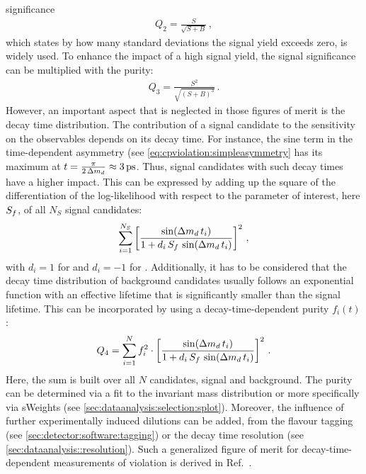 significance
\begin{align}
	Q_2 = \frac{S}{\sqrt{S + B}}\,,
\end{align}
which states by how many standard deviations the signal yield exceeds zero, is
widely used. To enhance the impact of a high signal yield, the signal
significance can be multiplied with the purity:
\begin{align}
	Q_3 = \frac{S^2}{\sqrt{(S + B)^3}}\,.
\end{align}
However, an important aspect that is neglected in those figures of merit is
the decay time distribution. The contribution of a signal candidate to the
sensitivity on the \CP observables depends on its decay time. For instance,
the sine term in the time-dependent asymmetry (see
\cref{eq:cpviolation:simpleasymmetry} has its maximum at $t =
\frac{\pi}{2\,\dmd} \approx \SI{3}{\ps}$. Thus, signal candidates with such
decay times have a higher impact. This can be expressed by adding up the
square of the differentiation of the log-likelihood with respect to the
parameter of interest, here $S_{f}$, of all $N_S$ signal candidates:
\begin{align}
	\sum_{i=1}^{N_S} \left[\frac{\sin({\Delta m_{{d}}}\,t_i)}{1 + d_i\,S_f\,\sin({\Delta m_{{d}}}\,t_i)}\right]^2\,,
\end{align}
with $d_i = \num{+1}$ for \Bd and $d_i = \num{-1}$ for \Bdb. Additionally, it
has to be considered that the decay time distribution of background candidates
usually follows an exponential function with an effective lifetime that is
significantly smaller than the \Bd signal lifetime. This can be incorporated
by using a decay-time-dependent purity $f_i(t)$:
\begin{align}
	Q_4 = \sum_{i=1}^{N} f_i^2 \cdot \left[\frac{\sin({\Delta m_{{d}}}\,t_i)}{1 + d_i\,S_f\,\sin({\Delta m_{{d}}}\,t_i)}\right]^2\,.
\end{align}
Here, the sum is built over all $N$ candidates, signal and background. The
purity can be determined via a fit to the invariant mass distribution or more
specifically via sWeights (see \cref{sec:dataanalysis:selection:splot}).
Moreover, the influence of further experimentally induced dilutions can be
added, \eg from the flavour tagging (see \cref{sec:detector:software:tagging})
or the decay time resolution (see \cref{sec:dataanalysis::resolution}). Such a
generalized figure of merit for decay-time-dependent measurements of
\CP violation is derived in Ref.~\cite{FOM}.